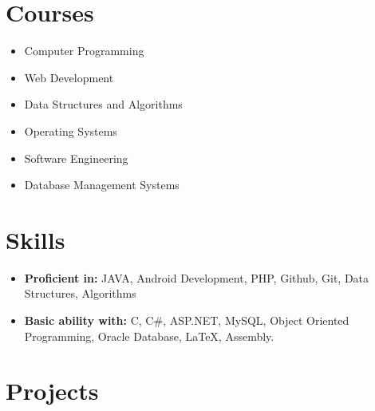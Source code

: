 \documentclass[11pt,a4paper,sans]{moderncv}        %
\begin{document}
\section{Courses}
\vspace{6pt}
\begin{itemize}
\item Computer Programming\vspace{4pt}
\item Web Development\vspace{4pt}
\item Data Structures and Algorithms \vspace{4pt}
\item Operating Systems\vspace{4pt}
\item Software Engineering\vspace{4pt}
\item Database Management Systems\vspace{6pt}
\end{itemize}
 		

\section{Skills}
\vspace{6pt}
\begin{itemize}
\item \textbf{Proficient in:} JAVA, Android Development, PHP, Github, Git, Data Structures, Algorithms\vspace{4pt}
\item \textbf{Basic ability with:} C, C\#, ASP.NET, MySQL, Object Oriented Programming,  Oracle Database, LaTeX, Assembly.

\vspace{6pt}
\end{itemize} 		


\section{Projects}
\vspace{6pt}
\end{document}

